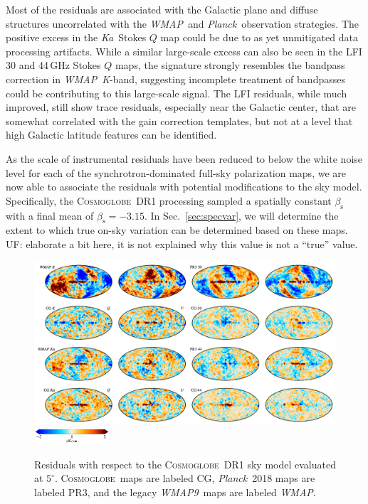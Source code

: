 \documentclass[twocolumn]{../../common/aa}
\def\WMAP{\emph{WMAP}}
\def\WMAPnine{\emph{WMAP9}}
\def\Planck{\emph{Planck}}
\newcommand{\red}[0]{\color{red}}
\newcommand{\cosmoglobe}{\textsc{Cosmoglobe}}
\newcommand{\K}[0]{\textit K}
\newcommand{\Ka}[0]{\textit{Ka}}
\begin{document}
Most of the residuals are associated with the Galactic plane and diffuse structures uncorrelated with the \WMAP\ and \Planck\ observation strategies. The positive excess in the \Ka\ Stokes $Q$ map could be due to as yet unmitigated data processing artifacts. While a similar large-scale excess can also be seen in the LFI 30 and 44\,GHz Stokes $Q$ maps, the signature strongly resembles the bandpass correction in \WMAP\ \K-band, suggesting incomplete treatment of bandpasses could be contributing to this large-scale signal.
The LFI residuals, while much improved, still show trace residuals, especially near the Galactic center, that are somewhat correlated with the gain correction templates, but not at a level that high Galactic latitude features can be identified. 

As the scale of instrumental residuals have been reduced to below the white noise level for each of the synchrotron-dominated full-sky polarization maps, we are now able to associate the residuals with potential modifications to the sky model. Specifically, the \cosmoglobe\ DR1 processing sampled a spatially constant $\beta_\mathrm s$ with a final mean of $\beta_\mathrm s=-3.15$. In Sec.~\ref{sec:specvar}, we will determine the extent to which true on-sky variation can be determined based on these maps.
{\red UF: elaborate a bit here, it is not explained why this value is not a ``true'' value.}

\begin{figure}
	\begin{center}
	\includegraphics[width=\textwidth]{figures/CG_DR1_residuals.pdf}
        \includegraphics[width=0.25\textwidth]{figures/cbar_5uK.pdf}
	\end{center}
	\caption{Residuals with respect to the \cosmoglobe\ DR1 sky model evaluated at $5^\circ$. \cosmoglobe\ maps are labeled CG, \Planck\ 2018 maps are labeled PR3, and the legacy \WMAPnine\ maps are labeled \WMAP.
	}
	\label{fig:cg_residuals}
\end{figure}
\end{document}
